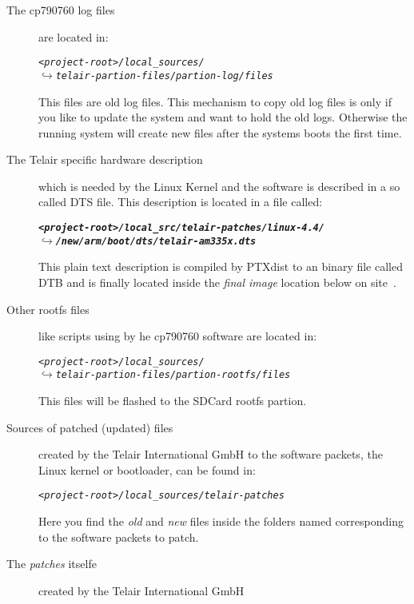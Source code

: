 \begin{description}
    \item[The cp790760 log files] are located in:
        \begin{alltt}
        \textit{<project-root>/local\_sources/
        \qquad\(\hookrightarrow\) telair-partion-files/partion-log/files}
        \end{alltt}
        This files are old log files. This mechanism to copy old log files is
        only if you like to update the system and want to hold the old logs.
        Otherwise the running system will create new files after the systems
        boots the first time.

    \item[The Telair specific hardware description] which is needed by the Linux
        Kernel and the software is described in a so called \gls{DTS} file.
        This description is located in a file called:

        \begin{alltt}
        \textit{\textbf{<project-root>/local\_src/telair-patches/linux-4.4/
        \qquad\(\hookrightarrow\) /new/arm/boot/dts/telair-am335x.dts}}
        \end{alltt}
        This plain text description is compiled by PTXdist to an binary file
        called \gls{DTB} and is finally located inside the \textit{final image}
        location below on site~\pageref{part:location_final_image}.

    \item[Other rootfs files] like scripts using by he cp790760 software are
        located in:

        \begin{alltt}
        \textit{<project-root>/local\_sources/
        \qquad\(\hookrightarrow\) telair-partion-files/partion-rootfs/files}
        \end{alltt}
        This files will be flashed to the SDCard rootfs partion.

    \item[Sources of patched (updated) files] created by the Telair
        International GmbH to the software packets, the Linux kernel or
        bootloader, can be found in:

        \begin{alltt}
        \textit{<project-root>/local\_sources/telair-patches}
        \end{alltt}

        Here you find the \textit{old} and \textit{new} files inside the folders
        named corresponding to the software packets to patch.
    \item[The \textit{patches} itselfe] created by the Telair International GmbH


\end{description}
